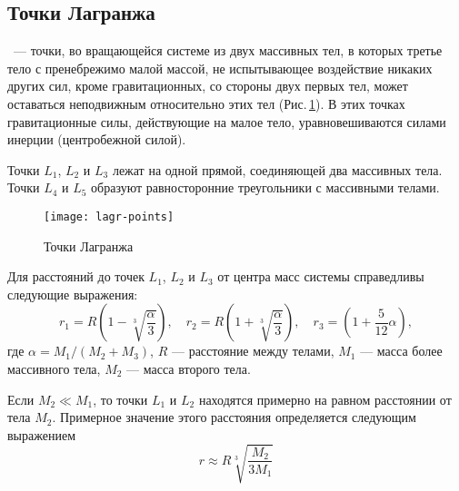 \subsection{Точки Лагранжа}

~--- точки, во вращающейся системе из двух
массивных тел, в которых третье тело с пренебрежимо 
малой массой, не испытывающее воздействие никаких 
других сил, кроме гравитационных, со стороны двух 
первых тел, может оставаться неподвижным относительно 
этих тел (Рис.\,\ref{pic:lagr-points}). В этих точках гравитационные силы, 
действующие на малое тело, уравновешиваются силами инерции (центробежной силой).

Точки $L_1$, $L_2$ и $L_3$ лежат на одной прямой, 
соединяющей два массивных тела. Точки $L_4$ и $L_5$ 
образуют равносторонние треугольники с массивными 
телами.
\begin{figure}[h!]
\centering
\texttt{[image: lagr-points]}
\caption{Точки Лагранжа}\label{pic:lagr-points}
\end{figure}

Для расстояний до точек $L_1$, $L_2$ и $L_3$ от 
центра масс системы справедливы следующие выражения:
\begin{equation}r_1=R\left(1-\sqrt[3]{\frac{\alpha}
{3}}\right), \quad r_2=R\left(1+\sqrt[3]{\frac{\alpha}
{3}}\right), \quad r_3=\left(1+\frac{5}{12}\alpha\right),
\end{equation}
где $\alpha=M_1/(M_2+M_3)$, $R$ --- расстояние между 
телами, $M_1$ --- масса более массивного тела, $M_2$
 --- масса второго тела.

Если $M_2\ll M_1$, то точки $L_1$ и $L_2$ находятся 
примерно на равном расстоянии от тела $M_2$. 
Примерное значение этого расстояния определяется следующим 
выражением\begin{equation}
r\approx R\sqrt[3]{\frac{M_2}{3M_1}}
\end{equation}
